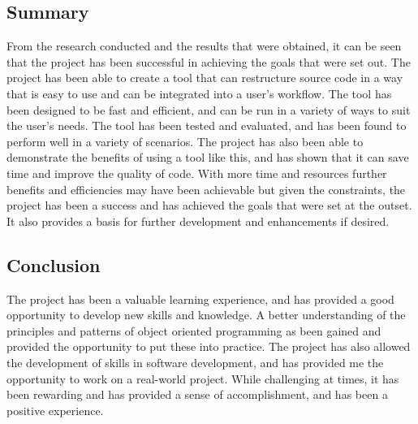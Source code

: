 \subsection{Summary}
From the research conducted and the results that were obtained, it can be seen that the project has been successful in achieving the goals that were set out. The project has been able to create a tool that can restructure source code in a way that is easy to use and can be integrated into a user's workflow. The tool has been designed to be fast and efficient, and can be run in a variety of ways to suit the user's needs. The tool has been tested and evaluated, and has been found to perform well in a variety of scenarios. The project has also been able to demonstrate the benefits of using a tool like this, and has shown that it can save time and improve the quality of code. With more time and resources further benefits and efficiencies may have been achievable but given the constraints, the project has been a success and has achieved the goals that were set at the outset. It also provides a basis for further development and enhancements if desired.

\subsection{Conclusion}
The project has been a valuable learning experience, and has provided a good opportunity to develop new skills and knowledge. A better understanding of the principles and patterns of object oriented programming as been gained and provided the opportunity to put these into practice. The project has also allowed the development of skills in software development, and has provided me the opportunity to work on a real-world project. While challenging at times, it has been rewarding and has provided a sense of accomplishment, and has been a positive experience.

